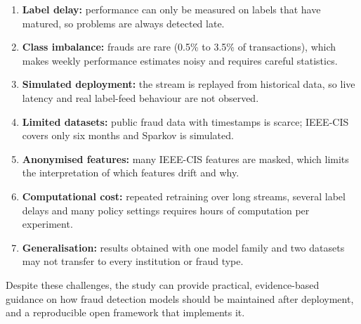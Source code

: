 \begin{enumerate}
  \item \textbf{Label delay:} performance can only be measured on labels that have matured, so problems are always detected late.
  \item \textbf{Class imbalance:} frauds are rare (0.5\% to 3.5\% of transactions), which makes weekly performance estimates noisy and requires careful statistics.
  \item \textbf{Simulated deployment:} the stream is replayed from historical data, so live latency and real label-feed behaviour are not observed.
  \item \textbf{Limited datasets:} public fraud data with timestamps is scarce; IEEE-CIS covers only six months and Sparkov is simulated.
  \item \textbf{Anonymised features:} many IEEE-CIS features are masked, which limits the interpretation of which features drift and why.
  \item \textbf{Computational cost:} repeated retraining over long streams, several label delays and many policy settings requires hours of computation per experiment.
  \item \textbf{Generalisation:} results obtained with one model family and two datasets may not transfer to every institution or fraud type.
\end{enumerate}

Despite these challenges, the study can provide practical, evidence-based guidance on how fraud detection models should be maintained after deployment, and a reproducible open framework that implements it.
